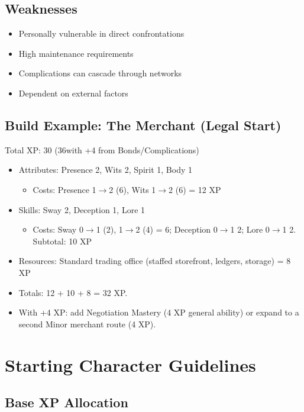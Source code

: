 \documentclass[11pt,twoside,openany]{book}
\begin{document}
\subsection*{Weaknesses}

\begin{itemize}
\item Personally vulnerable in direct confrontations
\item High maintenance requirements
\item Complications can cascade through networks
\item Dependent on external factors
\end{itemize}

\subsection*{Build Example: The Merchant (Legal Start)}

Total XP: 30 (36with +4 from Bonds/Complications)

\begin{itemize}
\item Attributes: Presence 2, Wits 2, Spirit 1, Body 1
\begin{itemize}
\item Costs: Presence 1$\rightarrow$2 (6), Wits 1$\rightarrow$2 (6) = 12 XP
\end{itemize}
\item Skills: Sway 2, Deception 1, Lore 1
\begin{itemize}
\item Costs: Sway 0$\rightarrow$1 (2), 1$\rightarrow$2 (4) = 6; Deception 0$\rightarrow$1 2; Lore 0$\rightarrow$1 2. Subtotal: 10 XP
\end{itemize}
\item Resources: Standard trading office (staffed storefront, ledgers, storage) = 8 XP
\item Totals: 12 + 10 + 8 = 32 XP.
\item With +4 XP: add Negotiation Mastery (4 XP general ability) or expand to a second Minor merchant route (4 XP).
\end{itemize}

\section*{Starting Character Guidelines} 

\subsection*{Base XP Allocation}
\end{document}
